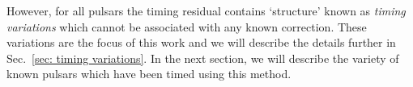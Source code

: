 However, for all pulsars the timing residual contains `structure' known as
\emph{timing variations} which cannot be associated with any known correction.
These variations are the focus of this work and we will describe the details
further in Sec.~\ref{sec: timing variations}.  In the next section, we will
describe the variety of known pulsars which have been timed using this method.


